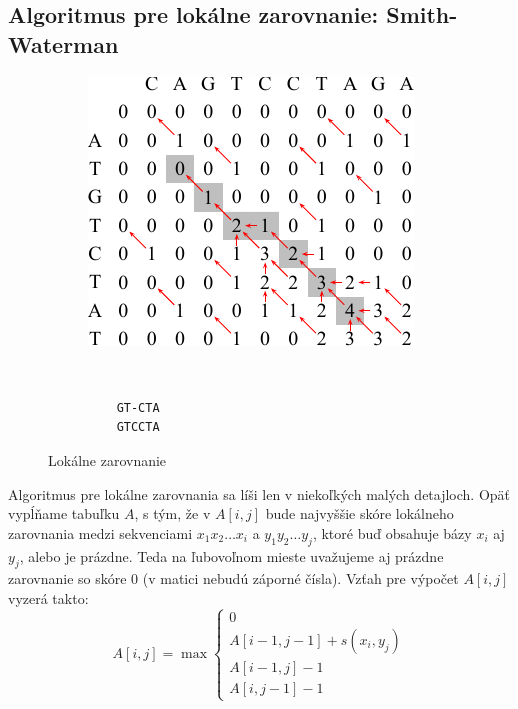 \subsection{Algoritmus pre lokálne zarovnanie: Smith-Waterman}


\begin{figure}[htp]
    \centering
    \begin{subfigure}[m]{0.5\textwidth}    
    \centering
    \includegraphics[width=\textwidth]{images/local_alignment}
    \end{subfigure}    
    ~
    \begin{subfigure}[m]{0.3\textwidth}    
    \centering
    \begin{verbatim}
    GT-CTA
    GTCCTA
    \end{verbatim}
    \end{subfigure}
    \caption{Lokálne zarovnanie}
    \label{fig:global_align}
\end{figure}

Algoritmus pre lokálne zarovnania sa líši len v niekoľkých malých detajloch. Opäť vypĺňame tabuľku $A$, s tým, že v $A[i,j]$ bude najvyššie skóre lokálneho zarovnania medzi sekvenciami $x_1x_2\dots x_i$ a $y_1y_2\dots y_j$, ktoré buď obsahuje bázy $x_i$ aj $y_j$, alebo je prázdne. Teda na ľubovoľnom mieste uvažujeme aj prázdne zarovnanie so skóre 0 (v matici nebudú záporné čísla). Vzťah pre výpočet $A[i,j]$ vyzerá takto:
$$A[i,j] = \max \left\{ 
\begin{array}{l}
0\\
A[i-1,j-1]+s(x_i, y_j)\\ 
A[i-1,j]-1\\
A[i,j-1]-1 
\end{array} \right.$$

